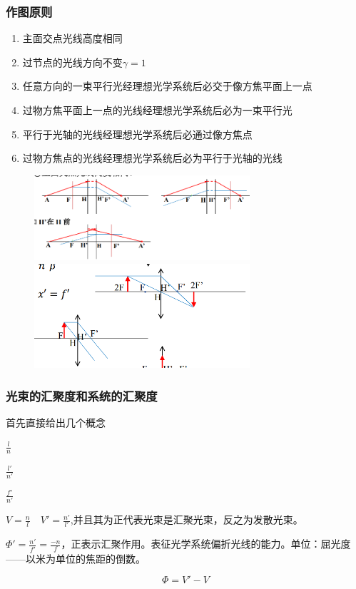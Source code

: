 \subsubsection{作图原则}
\begin{enumerate}[nosep]
\item 主面交点光线高度相同
\item 过节点的光线方向不变$\gamma =1$
\item 任意方向的一束平行光经理想光学系统后必交于像方焦平面上一点
\item 过物方焦平面上一点的光线经理想光学系统后必为一束平行光
\item 平行于光轴的光线经理想光学系统后必通过像方焦点
\item 过物方焦点的光线经理想光学系统后必为平行于光轴的光线
\end{enumerate}
        \begin{figure}[H]
            \centering
            \includegraphics[width=8cm]{img/3.4.png}
            
            \includegraphics[width=8cm]{img/3.5.png}
        \end{figure}
\subsubsection{光束的汇聚度和系统的汇聚度}
首先直接给出几个概念
\begin{description}[nosep]%
    \item[折合物距] $\displaystyle \frac{l}{n}$
    \item[折合像距]$\displaystyle \frac{l'}{n'}$
    \item[折合焦距]   $\displaystyle \frac{f'}{n'}$
    \item[汇聚度] $\displaystyle V=\frac{n}{l} \quad V'=\frac{n'}{l'}$,并且其为正代表光束是汇聚光束，反之为发散光束。
    \item[光焦度]  $\displaystyle \Phi'=\frac{n'}{f'}=\frac{-n}{f}$，正表示汇聚作用。表征光学系统偏折光线的能力。单位：屈光度——以米为单位的焦距的倒数。
\end{description}
\begin{equation}
\Phi=V'-V \tag{2.3.6}
\end{equation}
